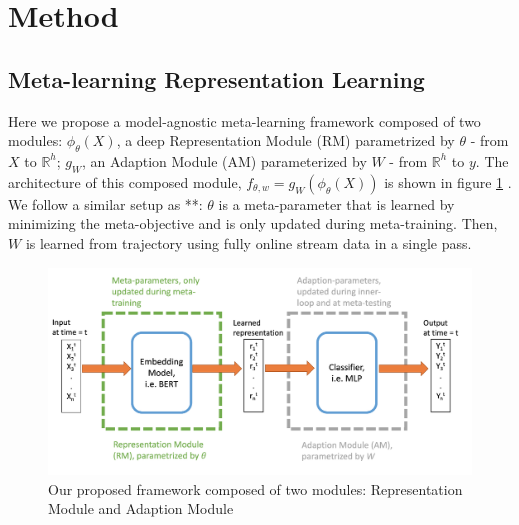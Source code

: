 \section{Method}

\subsection{Meta-learning Representation Learning}
\label{sec:mlr}
Here we propose a model-agnostic meta-learning framework composed of two modules: $\phi_\theta(X)$, a deep Representation Module (RM) parametrized by $\theta$ - from $X$ to $\mathbb{R} ^ {h}$; $g_W$, an Adaption Module (AM) parameterized by $W$ - from $\mathbb{R} ^ {h}$ to $y$. The architecture of this composed module, $f_{\theta, w} = g_W(\phi_\theta(X))$ is shown in figure \ref{img:1} . We follow a similar setup as **: $\theta$ is a meta-parameter that is learned by minimizing the meta-objective and is only updated during meta-training. Then, $W$ is learned from trajectory using fully online stream data in a single pass.

\begin{figure}[ht]
\centering
    \includegraphics[scale=0.6]{imgs/framework.jpg}
    \caption{Our proposed framework composed of two modules: Representation Module and Adaption Module}
    \label{img:1}
\end{figure}


